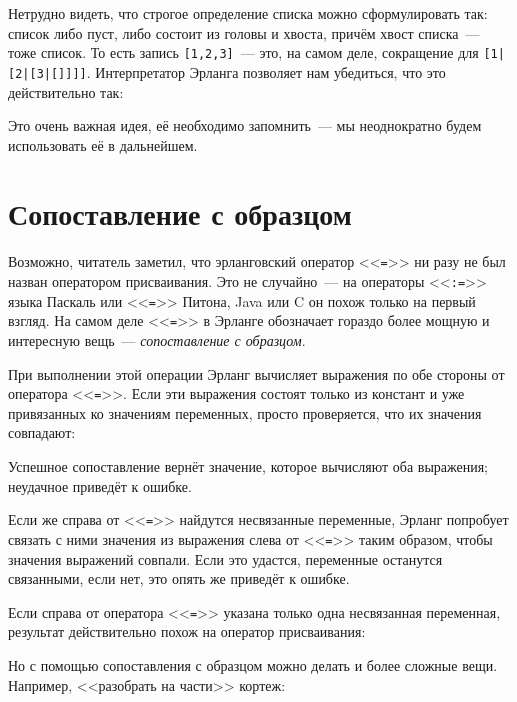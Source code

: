 \documentclass[
  paper=a4,
  fontsize=14pt,
  openany,
  appendixprefix=true
]{scrbook}
\begin{document}
\label{listdef}
Нетрудно видеть, что строгое определение списка можно сформулировать так: список либо пуст, либо состоит из головы и хвоста, причём хвост списка~--- тоже список. То есть запись \lstinline{[1,2,3]}~--- это, на самом деле, сокращение для \lstinline{[1|[2|[3|[]]]]}. Интерпретатор Эрланга позволяет нам убедиться, что это действительно так:

Это очень важная идея, её необходимо запомнить~--- мы неоднократно будем использовать её в дальнейшем.

\section{Сопоставление с образцом}
\label{pattern_matching}

Возможно, читатель заметил, что эрланговский оператор <<\lstinline{=}>> ни разу не был назван оператором присваивания. Это не случайно~--- на операторы <<\lstinline{:=}>> языка Паскаль или <<\lstinline{=}>> Питона, Java или C он похож только на первый взгляд. На самом деле <<\lstinline{=}>> в Эрланге обозначает гораздо более мощную и интересную вещь~--- \textit{сопоставление с образцом}.

При выполнении этой операции Эрланг вычисляет выражения по обе стороны от оператора <<\lstinline{=}>>. Если эти выражения состоят только из констант и уже привязанных ко значениям переменных, просто проверяется, что их значения совпадают:

Успешное сопоставление вернёт значение, которое вычисляют оба выражения; неудачное приведёт к ошибке.

Если же справа от <<\lstinline{=}>> найдутся несвязанные переменные, Эрланг попробует связать с ними значения из выражения слева от <<\lstinline{=}>> таким образом, чтобы значения выражений совпали. Если это удастся, переменные останутся связанными, если нет, это опять же приведёт к ошибке.

Если справа от оператора <<\lstinline{=}>> указана только одна несвязанная переменная, результат действительно похож на оператор присваивания:

Но с помощью сопоставления с образцом можно делать и более сложные вещи. Например, <<разобрать на части>> кортеж:
\end{document}
